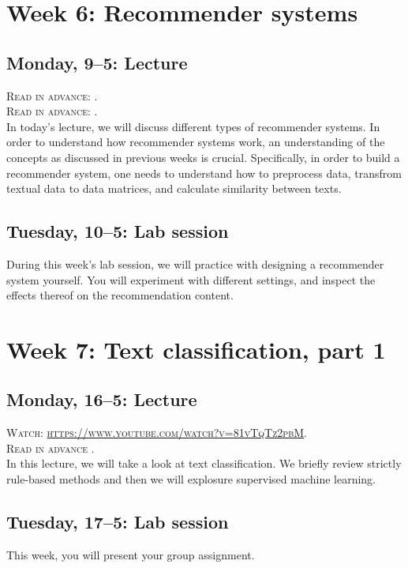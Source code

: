\section*{Week 6: Recommender systems}

\subsection*{Monday, 9--5: Lecture}
\textsc{ Read in advance: \cite{Moller2018}.}\\
\textsc{ Read in advance: \cite{Loecherbach2020}.}\\

In today's lecture, we will discuss different types of recommender systems. In order to understand how recommender systems work, an understanding of the concepts as discussed in previous weeks is crucial. Specifically, in order to build a recommender system, one needs to understand how to preprocess data, transfrom textual data to data matrices, and calculate similarity between texts. 

\subsection*{Tuesday, 10--5: Lab session}
During this week's lab session, we will practice with designing a recommender system yourself. You will experiment with different settings, and inspect the effects thereof on the recommendation content. 

\section*{Week 7: Text classification, part 1}
\subsection*{Monday, 16--5: Lecture}
\textsc{ Watch: \url{https://www.youtube.com/watch?v=81vTqTz2pbM}.}\\
\textsc{ Read in advance \cite{van_zoonen_social_2016}.}\\

In this lecture, we will take a look at text classification. We briefly review strictly rule-based methods and then we will explosure supervised machine learning.


\subsection*{Tuesday, 17--5: Lab session}
This week, you will present your group assignment. 

